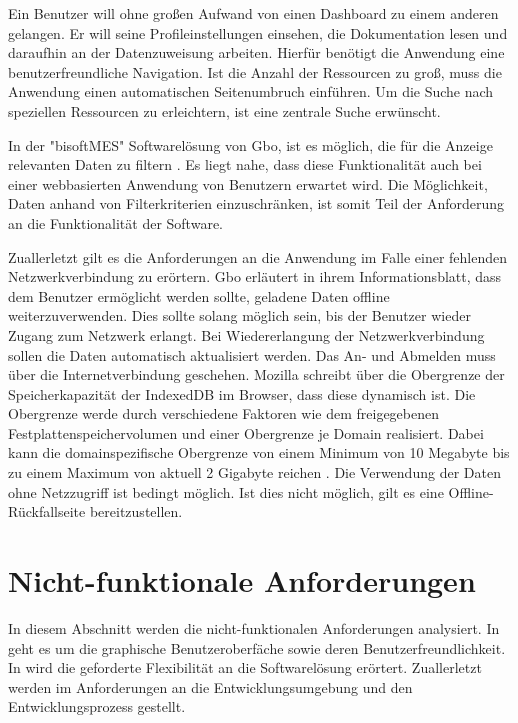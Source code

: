 Ein Benutzer will ohne großen Aufwand von einen Dashboard zu einem anderen gelangen. Er will seine Profileinstellungen
einsehen, die Dokumentation lesen und daraufhin an der Datenzuweisung arbeiten.
Hierfür benötigt die Anwendung eine benutzerfreundliche Navigation. Ist die Anzahl der Ressourcen zu 
groß, muss die Anwendung einen automatischen Seitenumbruch einführen. Um die Suche nach speziellen
Ressourcen zu erleichtern, ist eine zentrale Suche erwünscht.

In der "bisoftMES" Softwarelösung von Gbo, ist es möglich, die für die Anzeige relevanten Daten zu filtern \cite[S. 14]{BisoftMESHandbuch}.
Es liegt nahe, dass diese Funktionalität auch bei einer webbasierten Anwendung von Benutzern erwartet wird. Die Möglichkeit, Daten
anhand von Filterkriterien einzuschränken, ist somit Teil der Anforderung an die Funktionalität der Software.

Zuallerletzt gilt es die Anforderungen an die Anwendung im Falle einer fehlenden Netzwerkverbindung
zu erörtern. Gbo erläutert in ihrem Informationsblatt, dass dem Benutzer
ermöglicht werden sollte, geladene Daten offline weiterzuverwenden. Dies sollte solang möglich sein,
bis der Benutzer wieder Zugang zum Netzwerk erlangt. Bei Wiedererlangung der Netzwerkverbindung sollen
die Daten automatisch aktualisiert werden. Das An- und Abmelden muss über die Internetverbindung
geschehen. Mozilla schreibt über die Obergrenze der Speicherkapazität der IndexedDB im Browser,
dass diese dynamisch ist. Die Obergrenze werde durch verschiedene Faktoren wie dem freigegebenen
Festplattenspeichervolumen und einer Obergrenze je Domain realisiert. Dabei kann die domainspezifische
Obergrenze von einem Minimum von 10 Megabyte bis zu einem Maximum von aktuell 2 Gigabyte reichen \cite{MozillaStorageLimit}.
Die Verwendung der Daten ohne Netzzugriff ist bedingt möglich. Ist dies nicht möglich, gilt es
eine Offline-Rückfallseite bereitzustellen.

\section{Nicht-funktionale Anforderungen}
\label{sec:nichtfunktionaleanforderungen}
In diesem Abschnitt werden die nicht-funktionalen Anforderungen analysiert.
In  geht es um die graphische Benutzeroberfäche sowie
deren Benutzerfreundlichkeit. In  wird die geforderte
Flexibilität an die Softwarelösung erörtert. Zuallerletzt werden im 
Anforderungen an die Entwicklungsumgebung und den Entwicklungsprozess gestellt.

